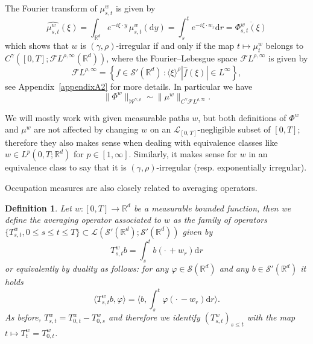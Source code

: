 \documentclass[10pt]{article}
\newcommand{\mathd}{\mathrm{d}}
\newtheorem{definition}[theorem]{Definition}
\begin{document}
The Fourier transform of $\mu^w_{s, t}$ is given by
\[ \widehat{\mu_{s, t}^w} (\xi) = \int_{\mathbb{R}^d} e^{- i \xi \cdot y} \,
   \mu_{s, t}^w (\mathd y) = \int_s^t e^{- i \xi \cdot w_r} \mathd r =
   \overline{\Phi^w_{s, t} (\xi)} \]
which shows that $w$ is $(\gamma, \rho)$\mbox{-}irregular if and only if the
map $t \mapsto \mu^w_t$ belongs to $C^{\gamma} ([0, T] ; \mathcal{F} L^{\rho,
\infty} (\mathbb{R}^d))$, where the Fourier--Lebesgue space $\mathcal{F}
L^{\rho, \infty}$ is given by
\[ \mathcal{F} L^{\rho, \infty} = \left\{ f \in \mathcal{S}' (\mathbb{R}^d) \,
   : \langle \xi \rangle^{\rho} | \hat{f} (\xi) | \in L^{\infty} \right\}, \]
see Appendix~\ref{appendixA2} for more details. In particular we have
\[ \| \Phi^w \|_{\mathcal{W}^{\gamma, \rho}} \sim \| \mu^w \|_{C^{\gamma}
   \mathcal{F} L^{\rho, \infty}} . \]
\begin{remark}
  \label{sec2.3 remark equivalence class}We will mostly work with given
  measurable paths $w$, but both definitions of $\Phi^w$ and $\mu^w$ are not
  affected by changing $w$ on an $\mathcal{L}_{[0, T]}$\mbox{-}negligible
  subset of $[0, T]$; therefore they also makes sense when dealing with
  equivalence classes like $w \in L^p (0, T ; \mathbb{R}^d)$ for $p \in [1,
  \infty]$. Similarly, it makes sense for $w$ in an equivalence class to say
  that it is $(\gamma, \rho)$\mbox{-}irregular (resp. exponentially
  irregular).
\end{remark}

Occupation measures are also closely related to averaging operators.

\begin{definition}
  \label{sec2.3 defn averaging operator}Let $w : [0, T] \rightarrow
  \mathbb{R}^d$ be a measurable bounded function, then we define the averaging
  operator associated to $w$ as the family of operators $\{ T^w_{s, t}, 0
  \leqslant s \leqslant t \leqslant T \} \subset \mathcal{L} (\mathcal{S}'
  (\mathbb{R}^d) ; \mathcal{S}' (\mathbb{R}^d))$ given by
  \[ T^w_{s, t} b = \int_s^t b \left( \cdot \, + w_r \right) \mathd r \]
  or equivalently by duality as follows: for any $\varphi \in \mathcal{S}
  (\mathbb{R}^d)$ and any $b \in \mathcal{S}' (\mathbb{R}^d)$ it holds
  \begin{equation}
    \langle T^w_{s, t} b, \varphi \rangle = \langle b, \int_s^t \varphi \left(
    \cdot \, - w_r \right) \mathd r \rangle . \label{sec2.3 defn averaging
    duality}
  \end{equation}
  As before, $T^w_{s, t} = T^w_{0, t} - T^w_{0, s}$ and therefore we identify
  $(T^w_{s, t})_{s \leqslant t}$ with the map $t \mapsto T^w_t = T^w_{0, t}$.
\end{definition}
\end{document}
